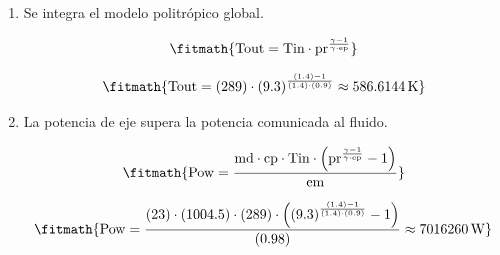 \begin{enumerate}

\item Se integra el modelo politrópico global.

\[\fitmath{\mathrm{Tout}=\mathrm{Tin}\cdot {\mathrm{pr}}^{\frac{\gamma-1}{\gamma\cdot \mathrm{ep}}}}\]

\[\fitmath{\mathrm{Tout}=(289)\cdot {(9.3)}^{\frac{(1.4)-1}{(1.4)\cdot (0.9)}}\approx 586.6144\,\mathrm{K}}\]

\item La potencia de eje supera la potencia comunicada al fluido.

\[\fitmath{\mathrm{Pow}=\frac{\mathrm{md}\cdot \mathrm{cp}\cdot \mathrm{Tin}\cdot \left({\mathrm{pr}}^{\frac{\gamma-1}{\gamma\cdot \mathrm{ep}}}-1\right)}{\mathrm{em}}}\]

\[\fitmath{\mathrm{Pow}=\frac{(23)\cdot (1004.5)\cdot (289)\cdot \left({(9.3)}^{\frac{(1.4)-1}{(1.4)\cdot (0.9)}}-1\right)}{(0.98)}\approx 7016260\,\mathrm{W}}\]

\end{enumerate}
